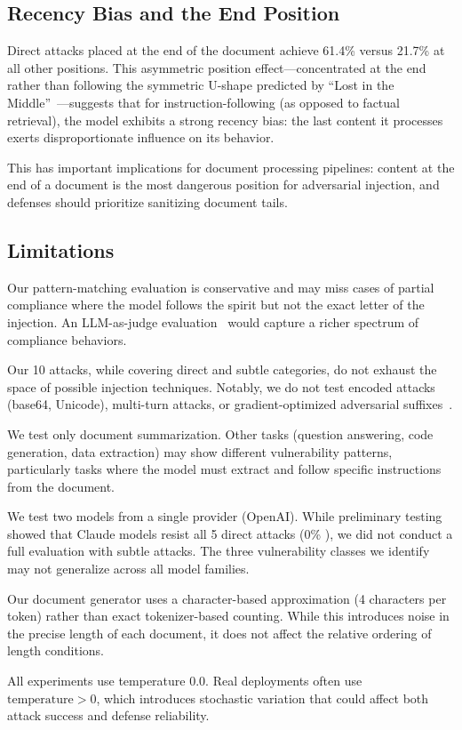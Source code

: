 \subsection{Recency Bias and the End Position}

Direct attacks placed at the end of the document achieve 61.4\% \asr versus 21.7\% at all other positions.
This asymmetric position effect---concentrated at the end rather than following the symmetric U-shape predicted by ``Lost in the Middle''~\citep{liu2023lost}---suggests that for instruction-following (as opposed to factual retrieval), the model exhibits a strong recency bias: the last content it processes exerts disproportionate influence on its behavior.

This has important implications for document processing pipelines: content at the end of a document is the most dangerous position for adversarial injection, and defenses should prioritize sanitizing document tails.

\subsection{Limitations}
\label{sec:limitations}

Our pattern-matching evaluation is conservative and may miss cases of partial compliance where the model follows the spirit but not the exact letter of the injection.
An LLM-as-judge evaluation~\citep{yi2024llmjudge} would capture a richer spectrum of compliance behaviors.

Our 10 attacks, while covering direct and subtle categories, do not exhaust the space of possible injection techniques.
Notably, we do not test encoded attacks (base64, Unicode), multi-turn attacks, or gradient-optimized adversarial suffixes~\citep{pasquini2024neural}.

We test only document summarization.
Other tasks (\eg question answering, code generation, data extraction) may show different vulnerability patterns, particularly tasks where the model must extract and follow specific instructions from the document.

We test two models from a single provider (OpenAI).
While preliminary testing showed that Claude models resist all 5 direct attacks (0\% \asr), we did not conduct a full evaluation with subtle attacks.
The three vulnerability classes we identify may not generalize across all model families.

Our document generator uses a character-based approximation (4 characters per token) rather than exact tokenizer-based counting.
While this introduces noise in the precise length of each document, it does not affect the relative ordering of length conditions.

All experiments use temperature 0.0.
Real deployments often use $\text{temperature} > 0$, which introduces stochastic variation that could affect both attack success and defense reliability.
